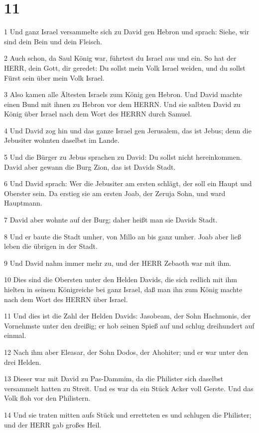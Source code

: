 \chapter{11}

\par 1 Und ganz Israel versammelte sich zu David gen Hebron und sprach: Siehe, wir sind dein Bein und dein Fleisch.
\par 2 Auch schon, da Saul König war, führtest du Israel aus und ein. So hat der HERR, dein Gott, dir geredet: Du sollst mein Volk Israel weiden, und du sollst Fürst sein über mein Volk Israel.
\par 3 Also kamen alle Ältesten Israels zum König gen Hebron. Und David machte einen Bund mit ihnen zu Hebron vor dem HERRN. Und sie salbten David zu König über Israel nach dem Wort des HERRN durch Samuel.
\par 4 Und David zog hin und das ganze Israel gen Jerusalem, das ist Jebus; denn die Jebusiter wohnten daselbst im Lande.
\par 5 Und die Bürger zu Jebus sprachen zu David: Du sollst nicht hereinkommen. David aber gewann die Burg Zion, das ist Davids Stadt.
\par 6 Und David sprach: Wer die Jebusiter am ersten schlägt, der soll ein Haupt und Oberster sein. Da erstieg sie am ersten Joab, der Zeruja Sohn, und ward Hauptmann.
\par 7 David aber wohnte auf der Burg; daher heißt man sie Davids Stadt.
\par 8 Und er baute die Stadt umher, von Millo an bis ganz umher. Joab aber ließ leben die übrigen in der Stadt.
\par 9 Und David nahm immer mehr zu, und der HERR Zebaoth war mit ihm.
\par 10 Dies sind die Obersten unter den Helden Davids, die sich redlich mit ihm hielten in seinem Königreiche bei ganz Israel, daß man ihn zum König machte nach dem Wort des HERRN über Israel.
\par 11 Und dies ist die Zahl der Helden Davids: Jasobeam, der Sohn Hachmonis, der Vornehmste unter den dreißig; er hob seinen Spieß auf und schlug dreihundert auf einmal.
\par 12 Nach ihm aber Eleasar, der Sohn Dodos, der Ahohiter; und er war unter den drei Helden.
\par 13 Dieser war mit David zu Pas-Dammim, da die Philister sich daselbst versammelt hatten zu Streit. Und es war da ein Stück Acker voll Gerste. Und das Volk floh vor den Philistern.
\par 14 Und sie traten mitten aufs Stück und erretteten es und schlugen die Philister; und der HERR gab großes Heil.
